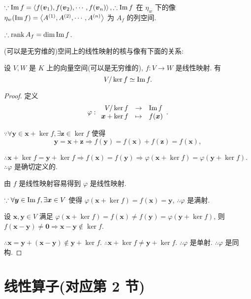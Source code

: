 \documentclass[color=black,device=normal,lang=cn,mode=geye]{elegantnote}
\begin{document}
$\because\operatorname{Im} f=\left<f(\boldsymbol{v}_1),f(\boldsymbol{v}_2),\cdots,f(\boldsymbol{v}_n)\right>,\therefore\operatorname{Im} f$ 在 $\eta_w$ 下的像 $\eta_w(\operatorname{Im} f)=\left<A^{(1)},A^{(2)},\cdots,A^{(n)}\right>$ 为 $A_f$ 的列空间.

$\therefore\operatorname{rank} A_f=\dim\operatorname{Im} f$.

(可以是无穷维的)空间上的线性映射的核与像有下面的关系:
\begin{theorem}\label{t1.3}
    设 $V,W$ 是 $K$ 上的向量空间(可以是无穷维的), $f:V\to W$ 是线性映射. 有
    \[V/\ker f\simeq\operatorname{Im} f.\]
\end{theorem}
\begin{proof}
    定义
    \[\varphi:\begin{array}{rcl}
        V/\ker f & \to & \operatorname{Im} f \\
        \boldsymbol{x}+\ker f & \mapsto & f(\boldsymbol{x}) \\
    \end{array}.\]

    $\because\forall\boldsymbol{y}\in\boldsymbol{x}+\ker f,\exists\boldsymbol{z}\in\ker f$ 使得
    \[\boldsymbol{y}=\boldsymbol{x}+\boldsymbol{z}\Rightarrow f(\boldsymbol{y})=f(\boldsymbol{x})+f(\boldsymbol{z})=f(\boldsymbol{x}),\]

    $\therefore\boldsymbol{x}+\ker f=\boldsymbol{y}+\ker f\Rightarrow f(\boldsymbol{x})=f(\boldsymbol{y})\Rightarrow\varphi(\boldsymbol{x}+\ker f)=\varphi(\boldsymbol{y}+\ker f)$. $\therefore\varphi$ 是确切定义的.

    由 $f$ 是线性映射容易得到 $\varphi$ 是线性映射.

    $\because\forall\boldsymbol{y}\in\operatorname{Im} f,\exists\boldsymbol{x}\in V$ 使得 $\varphi(\boldsymbol{x}+\ker f)=f(\boldsymbol{x})=\boldsymbol{y}$, $\therefore\varphi$ 是满射.

    设 $\boldsymbol{x},\boldsymbol{y}\in V$ 满足 $\varphi(\boldsymbol{x}+\ker f)=f(\boldsymbol{x})\neq f(\boldsymbol{y})=\varphi(\boldsymbol{y}+\ker f)$, 则 $f(\boldsymbol{x}-\boldsymbol{y})\neq\boldsymbol{0}\Rightarrow\boldsymbol{x}-\boldsymbol{y}\notin\ker f$.
    
    $\therefore\boldsymbol{x}=\boldsymbol{y}+(\boldsymbol{x}-\boldsymbol{y})\notin\boldsymbol{y}+\ker f$. $\therefore\boldsymbol{x}+\ker f\neq\boldsymbol{y}+\ker f$. $\therefore\varphi$ 是单射. $\therefore\varphi$ 是同构.
\end{proof}
\section{线性算子(对应第 2 节)}
\end{document}
